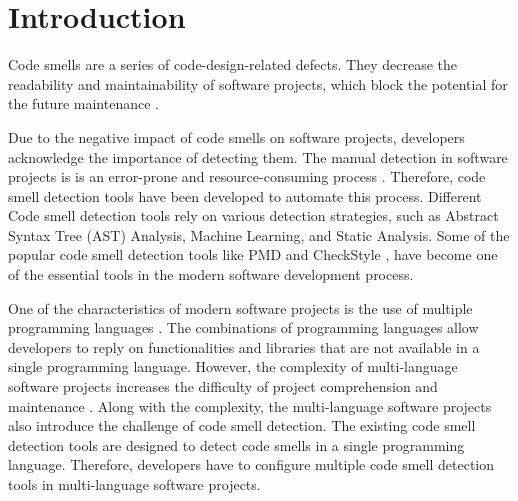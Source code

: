 \section{Introduction}
\label{sec:introduction}

%



Code smells are a series of code-design-related defects. They decrease the
readability \cite{5741260} and maintainability \cite{6392174} \cite{6405287} of software projects,
which block the potential for the future maintenance \cite{Fowler_Beck}.

Due to the negative impact of code smells on software projects,
developers acknowledge the importance of detecting them. The manual detection in
software projects is is an error-prone and resource-consuming process \cite{DetectingDefectsInObject}. 
Therefore, code smell detection tools have been developed to automate this process.
Different Code smell detection tools rely on various detection strategies,
such as Abstract Syntax Tree (AST) Analysis, Machine Learning, and Static Analysis.
Some of the popular code smell detection tools like PMD \cite{PMD} and CheckStyle \cite{CheckStyle}, have become one of the essential
tools in the modern software development process.

One of the characteristics of modern software projects is the use of multiple programming languages \cite{723183}. The combinations of
programming languages allow developers to reply on functionalities and libraries that are not available in a single programming language.
However, the complexity of multi-language software projects increases the difficulty of project comprehension and maintenance \cite{10.1109/SCAM.2012.11} \cite{7476675} \cite{7396422}.
Along with the complexity, the multi-language software projects also introduce the challenge of code smell detection. 
The existing code smell detection tools are designed to detect code smells in a single programming language. Therefore, developers have to configure multiple 
code smell detection tools in multi-language software projects.

